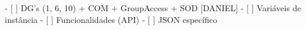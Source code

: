 - [ ] DG's (1, 6, 10) + COM + GroupAccess + SOD [DANIEL]
    - [ ] Variáveis de instância
    - [ ] Funcionalidades (API)
    - [ ] JSON específico
